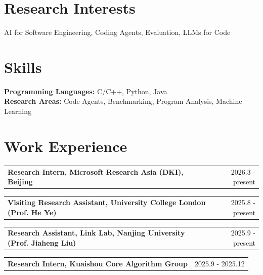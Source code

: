 \documentclass[a4paper,12pt]{article}
\makeatletter
\newenvironment{jobshort}[2]
    {
    \begin{tabularx}{\linewidth}{@{}X r@{}}
    \textbf{#1} & #2 \\[3.75pt]
    \end{tabularx}
    }
    {
    }
\makeatother
\begin{document}
\section{Research Interests}
AI for Software Engineering, Coding Agents, Evaluation, LLMs for Code

\section{Skills}
\textbf{Programming Languages:} C/C++, Python, Java \\
\textbf{Research Areas:} Code Agents, Benchmarking, Program Analysis, Machine Learning

\section{Work Experience}
\vspace{-0.1cm}

\begin{jobshort}{Research Intern, Microsoft Research Asia (DKI), Beijing}{2026.3 - present}
\end{jobshort}
\vspace{-0.6cm}

\begin{jobshort}{Visiting Research Assistant, University College London (Prof. He Ye)}{2025.8 - present}
\end{jobshort}
\vspace{-0.6cm}

\begin{jobshort}{Research Assistant, Link Lab, Nanjing University (Prof. Jiaheng Liu)}{2025.9 - present}
\end{jobshort}
\vspace{-0.6cm}

\begin{jobshort}{Research Intern, Kuaishou Core Algorithm Group}{2025.9 - 2025.12}
\end{jobshort}
\vspace{-0.6cm}
\end{document}
